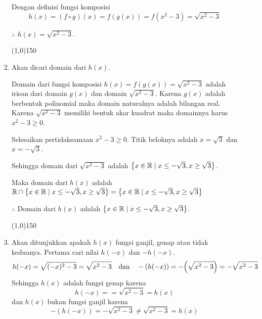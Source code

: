 \begin{enumerate}[leftmargin=*, label={\arabic*}.]
\begin{enumerate}[label={\alph*}.]
    Dengan definisi fungsi komposisi
    \[
    h(x)=(f \circ g)(x)=f(g(x))=f(x^{2}-3) = \sqrt{x^{2}-3}
    \]

    $\therefore$ $h(x) = \sqrt{x^{2}-3}$.
\begin{center}
    \line(1,0){150}
\end{center}
    \item Akan dicari domain dari $h(x)$.
    
    Domain dari fungsi komposisi $h(x)=f(g(x))=\sqrt{x^{2}-3}$ adalah irisan 
    dari domain $g(x)$ dan domain $\sqrt{x^{2}-3}$. Karena $g(x)$ adalah berbentuk 
    polinomial maka domain naturalnya adalah bilangan real. Karena $\sqrt{x^{2}-3}$ 
    memiliki bentuk akar kuadrat maka domainnya harus $x^{2}-3 \geq 0$.
    
    Selesaikan pertidaksamaan $x^{2}-3 \geq 0$. Titik beloknya adalah $x=\sqrt{3}$ 
    dan $x=-\sqrt{3}$.

    \begin{center}
    \end{center}
    Sehingga domain dari $\sqrt{x^{2}-3}$ adalah 
    $\set*{x \in \mathbb{R} \mid x \leq -\sqrt{3}, x \geq \sqrt{3}}$.

    Maka domain dari $h(x)$ adalah $\mathbb{R} \cap 
    \set*{x \in \mathbb{R} \mid x \leq -\sqrt{3}, x \geq \sqrt{3}} 
    = \set*{x \in \mathbb{R} \mid x \leq -\sqrt{3}, x \geq \sqrt{3}}$

    $\therefore$ Domain dari $h(x)$ adalah 
    $\set*{x \in \mathbb{R} \mid x \leq -\sqrt{3}, x \geq \sqrt{3}}$. 
\begin{center}
    \line(1,0){150}
\end{center}
    \item Akan ditunjukkan apakah $h(x)$ fungsi ganjil, genap atau tidak keduanya.
    Pertama cari nilai $h(-x)$ dan $-h(-x)$.
    \[
    h(-x) = \sqrt{(-x)^{2}-3} = \sqrt{x^{2}- 3} \quad \text{dan} \quad 
    -(h(-x)) = -\bracket*{\sqrt{x^{2}- 3}} = -\sqrt{x^{2}- 3}
    \]   
    Sehingga $h(x)$ adalah fungsi genap karena
    \[
        h(-x) =  = \sqrt{x^{2}- 3} = h(x)
    \]
    dan $h(x)$ bukan fungsi ganjil karena 
    \[
        -(h(-x)) = -\sqrt{x^{2}- 3} \neq \sqrt{x^{2}- 3} = h(x)
    \]


\end{enumerate}
\end{enumerate}
